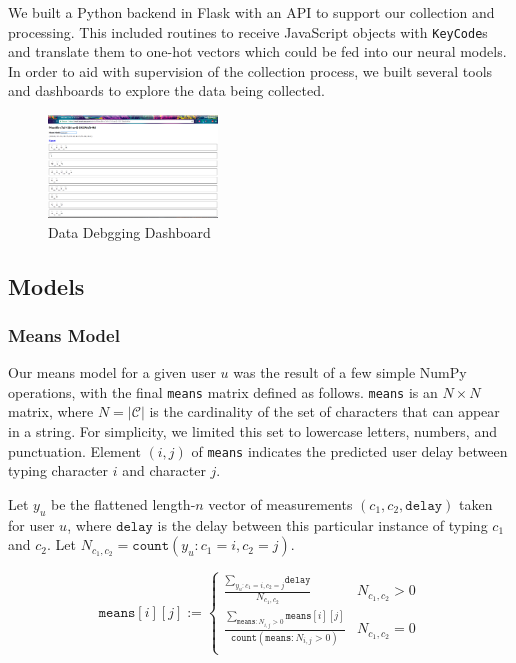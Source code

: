 \documentclass[9pt,journal]{IEEEtran}
\begin{document}
We built a Python backend in Flask with an API to support our collection and processing. This included routines to receive JavaScript objects with \texttt{KeyCode}s and translate them to one-hot vectors which could be fed into our neural models. In order to aid with supervision of the collection process, we built several tools and dashboards to explore the data being collected.

\begin{figure}[H]
  \centering
  \includegraphics[width=0.4\textwidth]{admin}
  \caption{Data Debgging Dashboard}
\end{figure}

\subsection{Models}
\subsubsection{Means Model}
Our means model for a given user $u$ was the result of a few simple NumPy operations, with the final \texttt{means} matrix defined as follows. \texttt{means} is an $N \times N$ matrix, where $N = |\mathcal{C}|$ is the cardinality of the set of characters that can appear in a string. For simplicity, we limited this set to lowercase letters, numbers, and punctuation. Element $(i, j)$ of \texttt{means} indicates the predicted user delay between typing character $i$ and character $j$.

Let $y_u$ be the flattened length-$n$ vector of measurements $(c_1, c_2, \texttt{delay})$ taken for user $u$, where $\texttt{delay}$ is the delay between this particular instance of typing $c_1$ and $c_2$. Let $N_{c_1, c_2} = \texttt{count}(y_u : c_1 = i, c_2 = j)$.

\[ \texttt{means}[i][j] :=
  \begin{cases}
      \frac{\sum_{y_u : c_1 = i, c_2 = j}{\texttt{delay}}}{N_{c_1, c_2}} & N_{c_1, c_2} > 0 \\
      \frac{\sum_{\texttt{means} : N_{i, j} > 0}{\texttt{means}[i][j]}}{\texttt{count}(\texttt{means} : N_{i, j} > 0)} & N_{c_1, c_2} = 0 \\
   \end{cases}
\]
\end{document}

